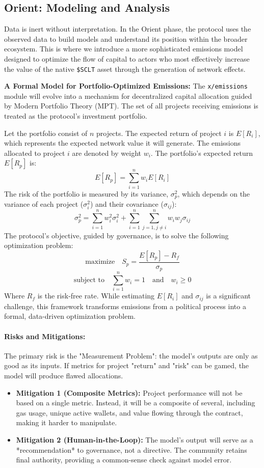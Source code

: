 \documentclass[10pt]{article}
\begin{document}
\subsection{Orient: Modeling and Analysis}
Data is inert without interpretation. In the Orient phase, the protocol uses the observed data to build models and understand its position within the broader ecosystem. This is where we introduce a more sophisticated emissions model designed to optimize the flow of capital to actors who most effectively increase the value of the native \texttt{\$SCLT} asset through the generation of network effects.

\textbf{A Formal Model for Portfolio-Optimized Emissions:} The \texttt{x/emissions} module will evolve into a mechanism for decentralized capital allocation guided by Modern Portfolio Theory (MPT). The set of all projects receiving emissions is treated as the protocol's investment portfolio.

Let the portfolio consist of \(n\) projects. The expected return of project \(i\) is \(E[R_i]\), which represents the expected network value it will generate. The emissions allocated to project \(i\) are denoted by weight \(w_i\). The portfolio's expected return \(E[R_p]\) is:
\[ E[R_p] = \sum_{i=1}^{n} w_i E[R_i] \]
The risk of the portfolio is measured by its variance, \(\sigma_p^2\), which depends on the variance of each project (\(\sigma_i^2\)) and their covariance (\(\sigma_{ij}\)):
\[ \sigma_p^2 = \sum_{i=1}^{n} w_i^2 \sigma_i^2 + \sum_{i=1}^{n} \sum_{j=1, j \neq i}^{n} w_i w_j \sigma_{ij} \]
The protocol's objective, guided by governance, is to solve the following optimization problem:
\[ \text{maximize} \quad S_p = \frac{E[R_p] - R_f}{\sigma_p} \]
\[ \text{subject to} \quad \sum_{i=1}^{n} w_i = 1 \quad \text{and} \quad w_i \ge 0 \]
Where \(R_f\) is the risk-free rate. While estimating \(E[R_i]\) and \(\sigma_{ij}\) is a significant challenge, this framework transforms emissions from a political process into a formal, data-driven optimization problem.

\paragraph{Risks and Mitigations:} The primary risk is the "Measurement Problem": the model's outputs are only as good as its inputs. If metrics for project "return" and "risk" can be gamed, the model will produce flawed allocations.
\begin{itemize}[leftmargin=*, itemsep=2pt]
    \item \textbf{Mitigation 1 (Composite Metrics):} Project performance will not be based on a single metric. Instead, it will be a composite of several, including gas usage, unique active wallets, and value flowing through the contract, making it harder to manipulate.
    \item \textbf{Mitigation 2 (Human-in-the-Loop):} The model's output will serve as a *recommendation* to governance, not a directive. The community retains final authority, providing a common-sense check against model error.
\end{itemize}
\end{document}
